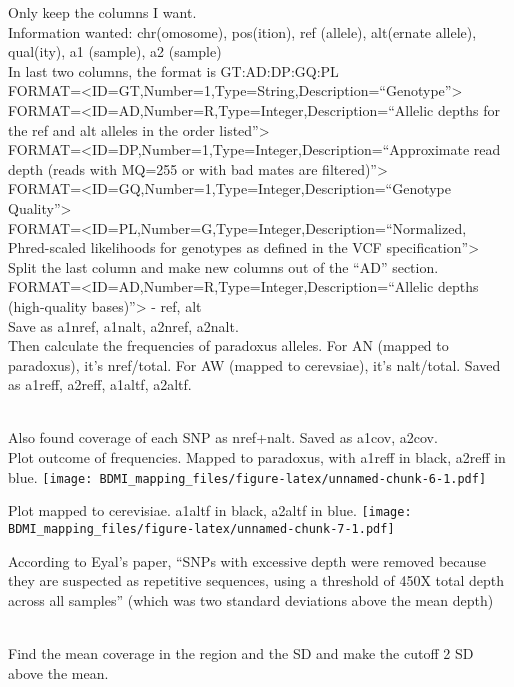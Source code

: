 \documentclass[
]{article}
\begin{document}
Only keep the columns I want.\\
Information wanted: chr(omosome), pos(ition), ref (allele), alt(ernate
allele), qual(ity), a1 (sample), a2 (sample)\\

In last two columns, the format is GT:AD:DP:GQ:PL\\
FORMAT=\textless ID=GT,Number=1,Type=String,Description=``Genotype''\textgreater{}\\
FORMAT=\textless ID=AD,Number=R,Type=Integer,Description=``Allelic
depths for the ref and alt alleles in the order listed''\textgreater{}\\
FORMAT=\textless ID=DP,Number=1,Type=Integer,Description=``Approximate
read depth (reads with MQ=255 or with bad mates are
filtered)''\textgreater{}\\
FORMAT=\textless ID=GQ,Number=1,Type=Integer,Description=``Genotype
Quality''\textgreater{}\\
FORMAT=\textless ID=PL,Number=G,Type=Integer,Description=``Normalized,
Phred-scaled likelihoods for genotypes as defined in the VCF
specification''\textgreater{}\\

Split the last column and make new columns out of the ``AD'' section.\\
FORMAT=\textless ID=AD,Number=R,Type=Integer,Description=``Allelic
depths (high-quality bases)''\textgreater{} - ref, alt\\
Save as a1nref, a1nalt, a2nref, a2nalt.\\

Then calculate the frequencies of paradoxus alleles. For AN (mapped to
paradoxus), it's nref/total. For AW (mapped to cerevsiae), it's
nalt/total. Saved as a1reff, a2reff, a1altf, a2altf.\\
\strut \\
Also found coverage of each SNP as nref+nalt. Saved as a1cov, a2cov.\\

Plot outcome of frequencies. Mapped to paradoxus, with a1reff in black,
a2reff in blue.
\texttt{[image: BDMI\_mapping\_files/figure-latex/unnamed-chunk-6-1.pdf]}

Plot mapped to cerevisiae. a1altf in black, a2altf in blue.
\texttt{[image: BDMI\_mapping\_files/figure-latex/unnamed-chunk-7-1.pdf]}

According to Eyal's paper, ``SNPs with excessive depth were removed
because they are suspected as repetitive sequences, using a threshold of
450X total depth across all samples'' (which was two standard deviations
above the mean depth)\\
\strut \\
Find the mean coverage in the region and the SD and make the cutoff 2 SD
above the mean.\\
\end{document}
